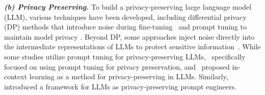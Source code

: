 
\textbf{\textit{(b) Privacy Preserving.}}
To build a privacy-preserving large language model (LLM), various techniques have been developed, including differential privacy (DP) methods that introduce noise during fine-tuning~\cite{Qu2021NaturalLU, shi-etal-2022-just} and prompt tuning to maintain model privacy \cite{duan2023denevil}. Beyond DP, some approaches inject noise directly into the intermediate representations of LLMs to protect sensitive information~\cite{10.1145/3336191.3371856, krishna-etal-2021-adept}. While some studies utilize prompt tuning for privacy-preserving LLMs,~\cite{Li2023PrivacyPreservingPT} specifically focused on using prompt tuning for privacy preservation, and~\cite{Panda2023PrivacyPreservingIL} proposed in-context learning as a method for privacy-preserving in LLMs. Similarly,~\cite{Hong2023DPOPTML} introduced a framework for LLMs as privacy-preserving prompt engineers.

